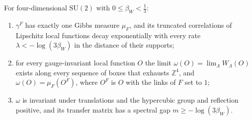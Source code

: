 \begin{theorem}\label{thm:onethird}
For four-dimensional $\mathrm{SU}(2)$ with $0\le\beta_{W}<\frac13$:
\begin{enumerate}[label=\textup{(\roman*)},leftmargin=*,itemsep=0pt]
\item $\gamma^{F}$ has exactly one Gibbs measure $\mu_{F}$, and its truncated correlations of Lipschitz local functions decay exponentially with every rate $\lambda<-\log(3\beta_{W})$ in the distance of their supports;
\item for every gauge-invariant local function $O$ the limit $\omega(O)=\lim_{\Lambda}W_{\Lambda}(O)$ exists along every sequence of boxes that exhausts $\mathbb{Z}^{4}$, and $\omega(O)=\mu_{F}(O^{F})$, where $O^{F}$ is $O$ with the links of $F$ set to $1$;
\item $\omega$ is invariant under translations and the hypercubic group and reflection positive, and its transfer matrix has a spectral gap $m\ge-\log(3\beta_{W})$.
\end{enumerate}
\end{theorem}

